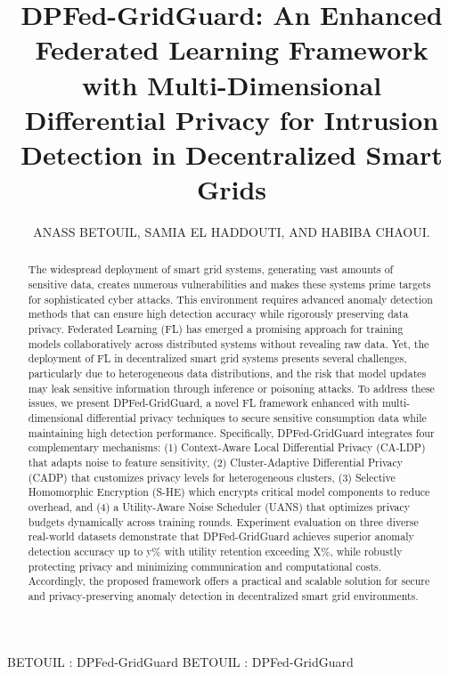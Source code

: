 \documentclass{ieeeaccess}
\theoremstyle{definition}
\begin{document}

\title{DPFed-GridGuard: An Enhanced Federated Learning Framework with Multi-Dimensional Differential Privacy for Intrusion Detection in Decentralized Smart Grids}
\author{\uppercase{Anass BETOUIL},
\uppercase{Samia EL HADDOUTI, and Habiba CHAOUI}.}
\address[1]{Laboratory of Advanced Systems Engineering, National School of Applied Sciences, Ibn Tofail University, Kenitra, Morocco}
\address[2]{National Higher School For Computer Science and Systems Analysis, Mohamed V University, Rabat, Morocco}
\address[3]{National Center for Scientific and Technical Research, Rabat, Morocco}

\markboth
{BETOUIL \headeretal: DPFed-GridGuard}
{BETOUIL \headeretal: DPFed-GridGuard}



\begin{abstract}
The widespread deployment of smart grid systems, generating vast amounts of sensitive data, creates numerous vulnerabilities and makes these systems prime targets for sophisticated cyber attacks. This environment requires advanced anomaly detection methods that can ensure high detection accuracy while rigorously preserving data privacy. Federated Learning (FL) has emerged a promising approach for training models collaboratively across distributed systems without revealing raw data. Yet, the deployment of FL in decentralized smart grid systems presents several challenges, particularly due to heterogeneous data distributions, and the risk that model updates may leak sensitive information through inference or poisoning attacks. To address these issues, we present DPFed-GridGuard, a novel FL framework enhanced with multi-dimensional differential privacy techniques to secure sensitive consumption data while maintaining high detection performance. Specifically, DPFed-GridGuard integrates four complementary mechanisms: (1) Context-Aware Local Differential Privacy (CA-LDP) that adapts noise to feature sensitivity, (2) Cluster-Adaptive Differential Privacy (CADP) that customizes privacy levels for heterogeneous clusters, (3) Selective Homomorphic Encryption (S-HE) which encrypts critical model components to reduce overhead, and (4) a Utility-Aware Noise Scheduler (UANS) that optimizes privacy budgets dynamically across training rounds. Experiment evaluation on three diverse real-world datasets demonstrate that DPFed-GridGuard achieves superior anomaly detection accuracy up to y\% with utility retention exceeding X\%, while robustly protecting privacy and minimizing communication and computational costs. Accordingly, the proposed framework offers a practical and scalable solution for secure and privacy-preserving anomaly detection in decentralized smart grid environments.
\end{abstract}
\end{document}
